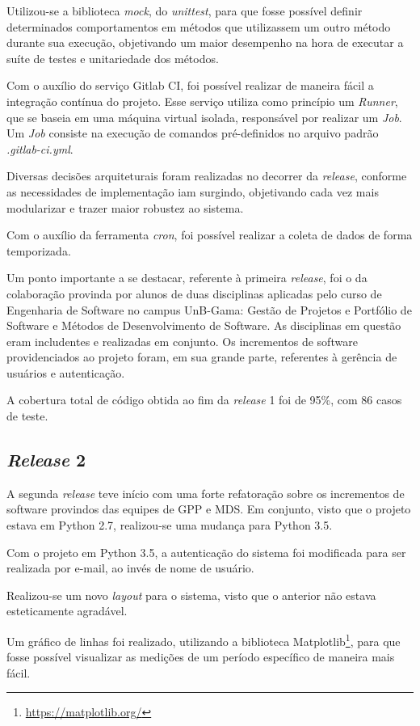Utilizou-se a biblioteca \textit{mock}, do \textit{unittest}, para que fosse possível definir determinados comportamentos em métodos que utilizassem um outro método durante sua execução, objetivando um maior desempenho na hora de executar a suíte de testes e unitariedade dos métodos.

Com o auxílio do serviço Gitlab CI, foi possível realizar de maneira fácil a integração contínua do projeto. Esse serviço utiliza como princípio um \textit{Runner}, que se baseia em uma máquina virtual isolada, responsável por realizar um \textit{Job}. Um \textit{Job} consiste na execução de comandos pré-definidos no arquivo padrão \textit{.gitlab-ci.yml}.

Diversas decisões arquiteturais foram realizadas no decorrer da \textit{release}, conforme as necessidades de implementação iam surgindo, objetivando cada vez mais modularizar e trazer maior robustez ao sistema.

Com o auxílio da ferramenta \textit{cron}, foi possível realizar a coleta de dados de forma temporizada.

Um ponto importante a se destacar, referente à primeira \textit{release}, foi o da colaboração provinda por alunos de duas disciplinas aplicadas pelo curso de Engenharia de Software no campus UnB-Gama: Gestão de Projetos e Portfólio de Software e Métodos de Desenvolvimento de Software. As disciplinas em questão eram includentes e realizadas em conjunto. Os incrementos de software providenciados ao projeto foram, em sua grande parte, referentes à gerência de usuários e autenticação.

A cobertura total de código obtida ao fim da \textit{release} 1 foi de 95\%, com 86 casos de teste.

\subsection{\textit{Release} 2}
A segunda \textit{release} teve início com uma forte refatoração sobre os incrementos de software provindos das equipes de GPP e MDS. Em conjunto, visto que o projeto estava em Python 2.7, realizou-se uma mudança para Python 3.5.

Com o projeto em Python 3.5, a autenticação do sistema foi modificada para ser realizada por e-mail, ao invés de nome de usuário.

Realizou-se um novo \textit{layout} para o sistema, visto que o anterior não estava esteticamente agradável.

Um gráfico de linhas foi realizado, utilizando a biblioteca Matplotlib\footnote{\url{https://matplotlib.org/}}, para que fosse possível visualizar as medições de um período específico de maneira mais fácil.

